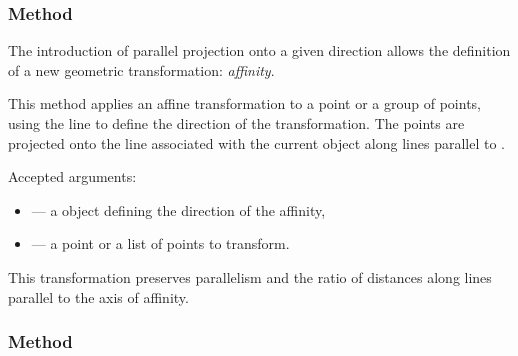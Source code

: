 \subsubsection{Method } %
\label{ssub:method_line_affinity}

The introduction of parallel projection onto a given direction allows the definition of a new geometric transformation: \emph{affinity}.

\medskip
\noindent
This method applies an affine transformation to a point or a group of points, using the line  to define the direction of the transformation. The points are projected onto the line associated with the current object along lines parallel to .

\medskip
\noindent
Accepted arguments:
\begin{itemize}
  \item {} — a  object defining the direction of the affinity,
  \item {} — a point or a list of points to transform.
\end{itemize}

\noindent
This transformation preserves parallelism and the ratio of distances along lines parallel to the axis of affinity.

\vspace{1em}

\begin{tkzexample}[latex=.5\textwidth]
\begin{center}
\end{center}

\end{tkzexample}


\subsubsection{Method } %
\label{ssub:example_translation}

